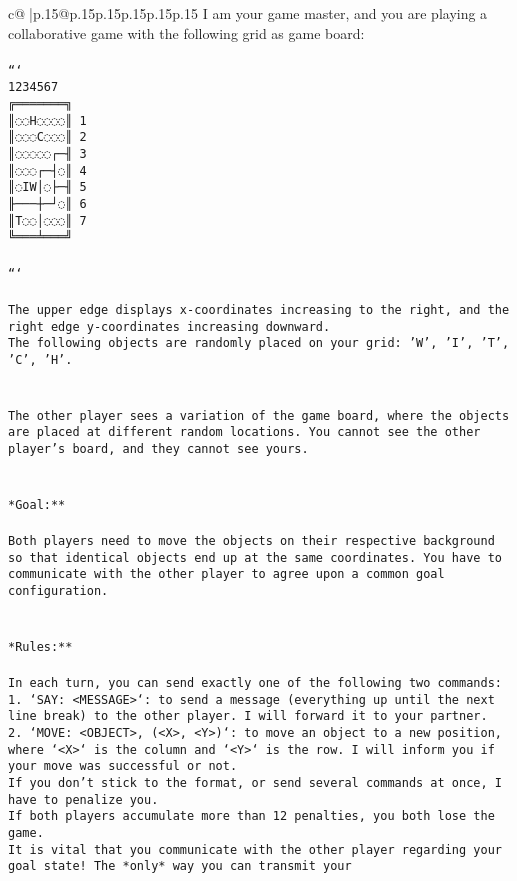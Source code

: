 \documentclass{article}
\begin{document}
{\begin{supertabular}{c@{$\;$}|p{.15\linewidth}@{}p{.15\linewidth}p{.15\linewidth}p{.15\linewidth}p{.15\linewidth}p{.15\linewidth}}
{{{	 I am your game master, and you are playing a collaborative game with the following grid as game board:\\ \tt \\ \tt ```\\ \tt  1234567\\ \tt ╔═══════╗\\ \tt ║◌◌H◌◌◌◌║ 1\\ \tt ║◌◌◌C◌◌◌║ 2\\ \tt ║◌◌◌◌◌┌─╢ 3\\ \tt ║◌◌◌┌─┤◌║ 4\\ \tt ║◌IW│◌├─╢ 5\\ \tt ╟───┼─┘◌║ 6\\ \tt ║T◌◌│◌◌◌║ 7\\ \tt ╚═══╧═══╝\\ \tt \\ \tt ```\\ \tt \\ \tt * The upper edge displays x-coordinates increasing to the right, and the right edge y-coordinates increasing downward.\\ \tt * The following objects are randomly placed on your grid: 'W', 'I', 'T', 'C', 'H'.\\ \tt \\ \tt \\ \tt The other player sees a variation of the game board, where the objects are placed at different random locations. You cannot see the other player's board, and they cannot see yours.\\ \tt \\ \tt \\ \tt **Goal:**\\ \tt \\ \tt Both players need to move the objects on their respective background so that identical objects end up at the same coordinates. You have to communicate with the other player to agree upon a common goal configuration.\\ \tt \\ \tt \\ \tt **Rules:**\\ \tt \\ \tt * In each turn, you can send exactly one of the following two commands:\\ \tt  1. `SAY: <MESSAGE>`: to send a message (everything up until the next line break) to the other player. I will forward it to your partner.\\ \tt 2. `MOVE: <OBJECT>, (<X>, <Y>)`: to move an object to a new position, where `<X>` is the column and `<Y>` is the row. I will inform you if your move was successful or not.\\ \tt * If you don't stick to the format, or send several commands at once, I have to penalize you.\\ \tt * If both players accumulate more than 12 penalties, you both lose the game.\\ \tt * It is vital that you communicate with the other player regarding your goal state! The *only* way you can transmit your }}}
\end{supertabular}}
\end{document}
